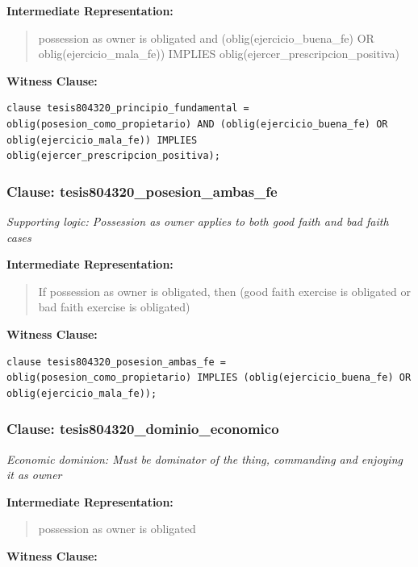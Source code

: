 \documentclass[11pt,a4paper]{article}
\begin{document}
\textbf{Intermediate Representation:}

\begin{quote}
possession as owner is obligated and (oblig(ejercicio\_buena\_fe) OR oblig(ejercicio\_mala\_fe)) IMPLIES oblig(ejercer\_prescripcion\_positiva)
\end{quote}

\textbf{Witness Clause:}

\begin{lstlisting}[style=witnessstyle, language=Witness]
clause tesis804320_principio_fundamental = oblig(posesion_como_propietario) AND (oblig(ejercicio_buena_fe) OR oblig(ejercicio_mala_fe)) IMPLIES oblig(ejercer_prescripcion_positiva);
\end{lstlisting}

\subsubsection{Clause: tesis804320\_posesion\_ambas\_fe}

\textit{Supporting logic: Possession as owner applies to both good faith and bad faith cases}

\textbf{Intermediate Representation:}

\begin{quote}
If possession as owner is obligated, then (good faith exercise is obligated or bad faith exercise is obligated)
\end{quote}

\textbf{Witness Clause:}

\begin{lstlisting}[style=witnessstyle, language=Witness]
clause tesis804320_posesion_ambas_fe = oblig(posesion_como_propietario) IMPLIES (oblig(ejercicio_buena_fe) OR oblig(ejercicio_mala_fe));
\end{lstlisting}

\subsubsection{Clause: tesis804320\_dominio\_economico}

\textit{Economic dominion: Must be dominator of the thing, commanding and enjoying it as owner}

\textbf{Intermediate Representation:}

\begin{quote}
possession as owner is obligated
\end{quote}

\textbf{Witness Clause:}
\end{document}
